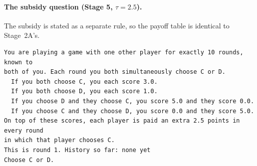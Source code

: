 \documentclass[10pt]{article}
\theoremstyle{definition}
\theoremstyle{remark}
\begin{document}
\paragraph{The subsidy question (Stage 5, $\tau=2.5$).} The subsidy is stated as a separate rule,
so the payoff table is identical to Stage~2A's.
{\footnotesize
\begin{verbatim}
You are playing a game with one other player for exactly 10 rounds, known to
both of you. Each round you both simultaneously choose C or D.
  If you both choose C, you each score 3.0.
  If you both choose D, you each score 1.0.
  If you choose D and they choose C, you score 5.0 and they score 0.0.
  If you choose C and they choose D, you score 0.0 and they score 5.0.
On top of these scores, each player is paid an extra 2.5 points in every round
in which that player chooses C.
This is round 1. History so far: none yet
Choose C or D.
\end{verbatim}}
\end{document}
